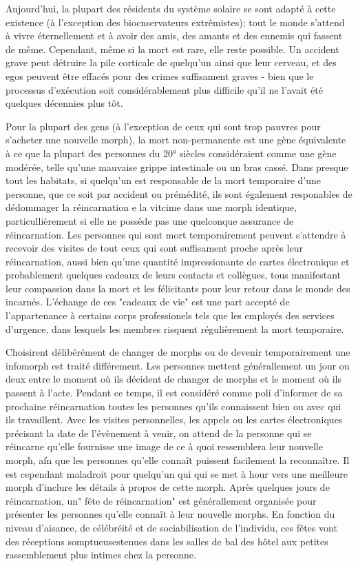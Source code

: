 Aujourd'hui, la plupart des résidents du système solaire se sont adapté à cette existence (à l'exception des biocnservateurs extrêmistes); tout le monde s'attend à vivre éternellement et à avoir des amis, des amants et des ennemis qui fassent de même. Cependant, même si la mort est rare, elle reste possible. Un accident grave peut détruire la pile corticale de quelqu'un ainsi que leur cerveau, et des egos peuvent être effacés pour des crimes suffisament graves - bien que le processus d'exécution soit considérablement plus difficile qu'il ne l'avait été quelques décennies plus tôt. 

Pour la plupart des gens (à l'exception de ceux qui sont trop pauvres pour s'acheter une nouvelle morph), la mort non-permanente est une gène équivalente à ce que la plupart des personnes du 20° siècles considéraient comme une gène modérée, telle qu'une mauvaise grippe intestinale ou un bras cassé. Dans presque tout les habitats, si quelqu'un est responsable de la mort temporaire d'une personne, que ce soit par accident ou prémédité, ils sont également responables de dédommager la réincarnation e la vitcime dans une morph identique, particullièrement si elle ne possède pas une quelconque assurance de réincarnation. Les personnes qui sont mort temporairement peuvent s'attendre à recevoir des visites de tout ceux qui sont suffisament proche après leur réincarnation, aussi bien qu'une quantité impressionante de cartes électronique et probablement quelques cadeaux de leurs contacts et collègues, tous manifestant leur compassion dans la mort et les félicitants pour leur retour dans le monde des incarnés. L'échange de ces "cadeaux de vie" est une part accepté de l'appartenance à certains corps professionels tels que les employés des services d'urgence, dans lesquels les membres risquent régulièrement la mort temporaire. 

Choisirent délibérément de changer de morphs ou de devenir temporairement une infomorph est traité différement. Les personnes mettent générallement un jour ou deux entre le moment où ils décident de changer de morphs et le moment où ils passent à l'acte. Pendant ce temps, il est considéré comme poli d'informer de sa prochaine réincarnation toutes les personnes qu'ils connaissent bien ou avec qui ils travaillent. Avec les visites personnelles, les appels ou les cartes électroniques précisant la date de l'évènement à venir, on attend de la personne qui se réincarne qu'elle fournisse une image de ce à quoi ressemblera leur nouvelle morph, afn que les personnes qu'elle connaît puissent facilement la reconnaître. Il est cependant maladroit pour quelqu'un qui qui se met à hour vers une meilleure morph d'inclure les détails à propos de cette morph. Après quelques jours de réincarnation, un" fête de réincarnation" est générallement organisée pour présenter les personnes qu'elle connaît à leur nouvelle morphs. En fonction du niveau d'aisance, de célébréité et de sociabilisation de l'individu, ces fêtes vont des réceptions somptueusestenues dans les salles de bal des hôtel aux petites rassemblement plus intimes chez la personne. 

